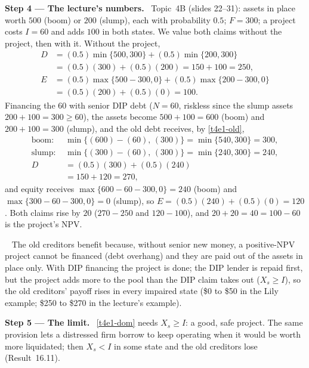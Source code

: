 \documentclass[11pt,a4paper]{article}
\newcommand{\step}[2]{\par\medskip\noindent\textbf{Step #1 --- #2.}~}
\newcommand{\answer}[1]{\par\smallskip\noindent\fbox{\textbf{Answer #1.}}~}
\begin{document}
\step{4}{The lecture's numbers} Topic~4B (slides 22--31): assets in place worth $500$ (boom)
or $200$ (slump), each with probability $0.5$; $F=300$; a project costs $I=60$ and adds $100$
in both states. We value both claims without the project, then with it. Without the project,
\begin{align}
  D &= (0.5)\min\{500,300\}+(0.5)\min\{200,300\} \nonumber\\
    &= (0.5)(300)+(0.5)(200) = 150+100 = 250, \nonumber\\
  E &= (0.5)\max\{500-300,0\}+(0.5)\max\{200-300,0\} \nonumber\\
    &= (0.5)(200)+(0.5)(0) = 100. \nonumber
\end{align}
Financing the $60$ with senior DIP debt ($N=60$, riskless since the slump assets $200+100=300\ge 60$),
the assets become $500+100=600$ (boom) and $200+100=300$ (slump), and the old debt
receives, by \eqref{t4e1-old},
\begin{align}
  \text{boom: } & \min\{(600)-(60),\,(300)\} = \min\{540,300\} = 300, \nonumber\\
  \text{slump: } & \min\{(300)-(60),\,(300)\} = \min\{240,300\} = 240, \nonumber\\
  D &= (0.5)(300)+(0.5)(240) \label{t4e1-D}\\
    &= 150+120 = 270, \nonumber
\end{align}
and equity receives $\max\{600-60-300,0\}=240$ (boom) and $\max\{300-60-300,0\}=0$ (slump), so
$E=(0.5)(240)+(0.5)(0)=120$. Both claims rise by $20$ ($270-250$ and $120-100$), and
$20+20=40=100-60$ is the project's NPV.

\answer{(16.14)} The old creditors benefit because, without senior new money, a positive-NPV project
cannot be financed (debt overhang) and they are paid out of the assets in place only. With DIP
financing the project is done; the DIP lender is repaid first, but the project adds more to the
pool than the DIP claim takes out ($X_s\ge I$), so the old creditors' payoff rises in every
impaired state (\$0 to \$50 in the Lily example; \$250 to \$270 in the lecture's example).

\step{5}{The limit} \eqref{t4e1-dom} needs $X_s\ge I$: a good, safe project. The same provision
lets a distressed firm borrow to keep operating when it would be worth more liquidated; then
$X_s<I$ in some state and the old creditors lose (Result~16.11).
\end{document}

